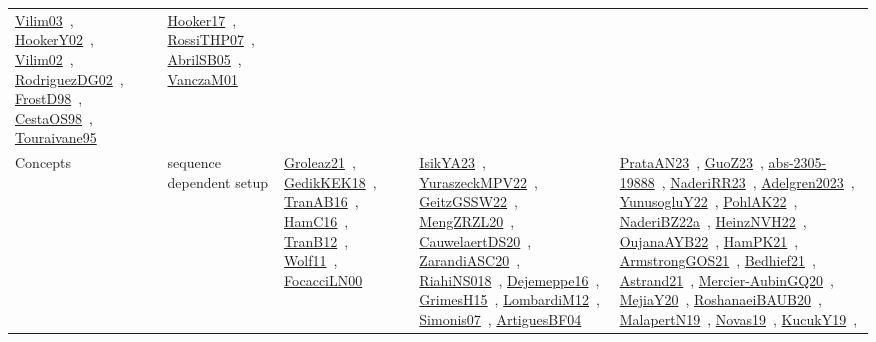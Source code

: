 {\begin{longtable}{lp{3cm}>{\raggedright\arraybackslash}p{6cm}>{\raggedright\arraybackslash}p{6cm}>{\raggedright\arraybackslash}p{8cm}}
\href{../works/Vilim03.pdf}{Vilim03}~\cite{Vilim03}, \href{../works/HookerY02.pdf}{HookerY02}~\cite{HookerY02}, \href{../works/Vilim02.pdf}{Vilim02}~\cite{Vilim02}, \href{../works/RodriguezDG02.pdf}{RodriguezDG02}~\cite{RodriguezDG02}, \href{../works/FrostD98.pdf}{FrostD98}~\cite{FrostD98}, \href{../works/CestaOS98.pdf}{CestaOS98}~\cite{CestaOS98}, \href{../works/Touraivane95.pdf}{Touraivane95}~\cite{Touraivane95} & \href{../works/Hooker17.pdf}{Hooker17}~\cite{Hooker17}, \href{../works/RossiTHP07.pdf}{RossiTHP07}~\cite{RossiTHP07}, \href{../works/AbrilSB05.pdf}{AbrilSB05}~\cite{AbrilSB05}, \href{../works/VanczaM01.pdf}{VanczaM01}~\cite{VanczaM01}\\
Concepts & sequence dependent setup & \href{../works/Groleaz21.pdf}{Groleaz21}~\cite{Groleaz21}, \href{../works/GedikKEK18.pdf}{GedikKEK18}~\cite{GedikKEK18}, \href{../works/TranAB16.pdf}{TranAB16}~\cite{TranAB16}, \href{../works/HamC16.pdf}{HamC16}~\cite{HamC16}, \href{../works/TranB12.pdf}{TranB12}~\cite{TranB12}, \href{../works/Wolf11.pdf}{Wolf11}~\cite{Wolf11}, \href{../works/FocacciLN00.pdf}{FocacciLN00}~\cite{FocacciLN00} & \href{../works/IsikYA23.pdf}{IsikYA23}~\cite{IsikYA23}, \href{../works/YuraszeckMPV22.pdf}{YuraszeckMPV22}~\cite{YuraszeckMPV22}, \href{../works/GeitzGSSW22.pdf}{GeitzGSSW22}~\cite{GeitzGSSW22}, \href{../works/MengZRZL20.pdf}{MengZRZL20}~\cite{MengZRZL20}, \href{../works/CauwelaertDS20.pdf}{CauwelaertDS20}~\cite{CauwelaertDS20}, \href{../works/ZarandiASC20.pdf}{ZarandiASC20}~\cite{ZarandiASC20}, \href{../works/RiahiNS018.pdf}{RiahiNS018}~\cite{RiahiNS018}, \href{../works/Dejemeppe16.pdf}{Dejemeppe16}~\cite{Dejemeppe16}, \href{../works/GrimesH15.pdf}{GrimesH15}~\cite{GrimesH15}, \href{../works/LombardiM12.pdf}{LombardiM12}~\cite{LombardiM12}, \href{../works/Simonis07.pdf}{Simonis07}~\cite{Simonis07}, \href{../works/ArtiguesBF04.pdf}{ArtiguesBF04}~\cite{ArtiguesBF04} & \href{../works/PrataAN23.pdf}{PrataAN23}~\cite{PrataAN23}, \href{../works/GuoZ23.pdf}{GuoZ23}~\cite{GuoZ23}, \href{../works/abs-2305-19888.pdf}{abs-2305-19888}~\cite{abs-2305-19888}, \href{../works/NaderiRR23.pdf}{NaderiRR23}~\cite{NaderiRR23}, \href{../works/Adelgren2023.pdf}{Adelgren2023}~\cite{Adelgren2023}, \href{../works/YunusogluY22.pdf}{YunusogluY22}~\cite{YunusogluY22}, \href{../works/PohlAK22.pdf}{PohlAK22}~\cite{PohlAK22}, \href{../works/NaderiBZ22a.pdf}{NaderiBZ22a}~\cite{NaderiBZ22a}, \href{../works/HeinzNVH22.pdf}{HeinzNVH22}~\cite{HeinzNVH22}, \href{../works/OujanaAYB22.pdf}{OujanaAYB22}~\cite{OujanaAYB22}, \href{../works/HamPK21.pdf}{HamPK21}~\cite{HamPK21}, \href{../works/ArmstrongGOS21.pdf}{ArmstrongGOS21}~\cite{ArmstrongGOS21}, \href{../works/Bedhief21.pdf}{Bedhief21}~\cite{Bedhief21}, \href{../works/Astrand21.pdf}{Astrand21}~\cite{Astrand21}, \href{../works/Mercier-AubinGQ20.pdf}{Mercier-AubinGQ20}~\cite{Mercier-AubinGQ20}, \href{../works/MejiaY20.pdf}{MejiaY20}~\cite{MejiaY20}, \href{../works/RoshanaeiBAUB20.pdf}{RoshanaeiBAUB20}~\cite{RoshanaeiBAUB20}, \href{../works/MalapertN19.pdf}{MalapertN19}~\cite{MalapertN19}, \href{../works/Novas19.pdf}{Novas19}~\cite{Novas19}, \href{../works/KucukY19.pdf}{KucukY19}~\cite{KucukY19}, 
\end{longtable}}
